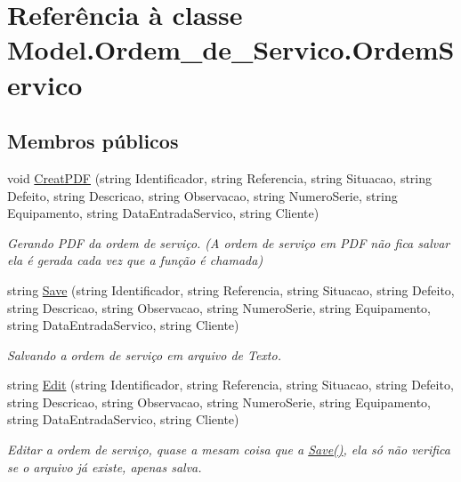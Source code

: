 \hypertarget{class_model_1_1_ordem__de___servico_1_1_ordem_servico}{}\section{Referência à classe Model.\+Ordem\+\_\+de\+\_\+\+Servico.\+Ordem\+Servico}
\label{class_model_1_1_ordem__de___servico_1_1_ordem_servico}
\subsection*{Membros públicos}
\begin{DoxyCompactItemize}
\item 
void \hyperlink{class_model_1_1_ordem__de___servico_1_1_ordem_servico_aa2063b330d10dd34cffe6b354c5587fc}{Creat\+P\+D\+F} (string Identificador, string Referencia, string Situacao, string Defeito, string Descricao, string Observacao, string Numero\+Serie, string Equipamento, string Data\+Entrada\+Servico, string Cliente)
\begin{DoxyCompactList}\small\item\em Gerando P\+D\+F da ordem de serviço. (A ordem de serviço em P\+D\+F não fica salvar ela é gerada cada vez que a função é chamada) \end{DoxyCompactList}\item 
string \hyperlink{class_model_1_1_ordem__de___servico_1_1_ordem_servico_a098688c9491c28d72a3eba5dc9be5f89}{Save} (string Identificador, string Referencia, string Situacao, string Defeito, string Descricao, string Observacao, string Numero\+Serie, string Equipamento, string Data\+Entrada\+Servico, string Cliente)
\begin{DoxyCompactList}\small\item\em Salvando a ordem de serviço em arquivo de Texto. \end{DoxyCompactList}\item 
string \hyperlink{class_model_1_1_ordem__de___servico_1_1_ordem_servico_a7fe5d0e2c821d51a6bca866c1e861495}{Edit} (string Identificador, string Referencia, string Situacao, string Defeito, string Descricao, string Observacao, string Numero\+Serie, string Equipamento, string Data\+Entrada\+Servico, string Cliente)
\begin{DoxyCompactList}\small\item\em Editar a ordem de serviço, quase a mesam coisa que a \hyperlink{class_model_1_1_ordem__de___servico_1_1_ordem_servico_a098688c9491c28d72a3eba5dc9be5f89}{Save()}, ela só não verifica se o arquivo já existe, apenas salva. \end{DoxyCompactList}\item 

\end{DoxyCompactItemize}
